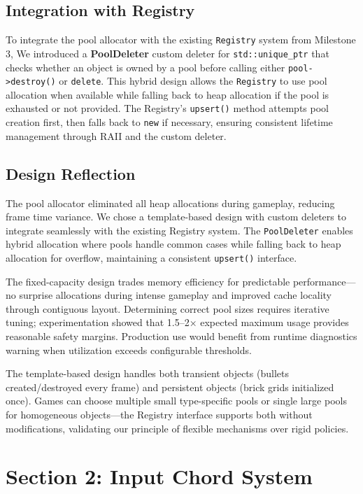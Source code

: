 \documentclass[12pt]{article}
\begin{document}
\subsection{Integration with Registry}

To integrate the pool allocator with the existing \texttt{Registry} system from Milestone 3, We introduced a \textbf{PoolDeleter} custom deleter for \texttt{std::unique\_ptr} that checks whether an object is owned by a pool before calling either \texttt{pool->destroy()} or \texttt{delete}. This hybrid design allows the \texttt{Registry} to use pool allocation when available while falling back to heap allocation if the pool is exhausted or not provided. The Registry's \texttt{upsert()} method attempts pool creation first, then falls back to \texttt{new} if necessary, ensuring consistent lifetime management through RAII and the custom deleter.

\subsection{Design Reflection}

The pool allocator eliminated all heap allocations during gameplay, reducing frame time variance. We chose a template-based design with custom deleters to integrate seamlessly with the existing Registry system. The \texttt{PoolDeleter} enables hybrid allocation where pools handle common cases while falling back to heap allocation for overflow, maintaining a consistent \texttt{upsert()} interface.

The fixed-capacity design trades memory efficiency for predictable performance—no surprise allocations during intense gameplay and improved cache locality through contiguous layout. Determining correct pool sizes requires iterative tuning; experimentation showed that 1.5–2× expected maximum usage provides reasonable safety margins. Production use would benefit from runtime diagnostics warning when utilization exceeds configurable thresholds.

The template-based design handles both transient objects (bullets created/destroyed every frame) and persistent objects (brick grids initialized once). Games can choose multiple small type-specific pools or single large pools for homogeneous objects—the Registry interface supports both without modifications, validating our principle of flexible mechanisms over rigid policies.

\section{Section 2: Input Chord System}
\end{document}
